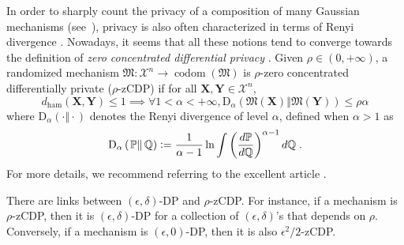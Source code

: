 \documentclass[10pt]{article} %
\newcommand{\eqdef}{\vcentcolon=}
\newcommand\mech[1]{\mathfrak{#1}}
\newcommand\set[1]{\mathcal{#1}}
\newcommand\vect[1]{\mathbf{#1}}
\newcommand\codom[1]{\operatorname{codom}\left({#1}\right)}
\newcommand\renyi[3]{\text{D}_{#1}\left( \left. {#2}\right\Vert {#3} \right)}
\newcommand\ham[2]{d_\mathrm{ham}\left( {#1}, {#2} \right)}
\newcommand\p[1]{\left( {#1}\right)}
\begin{document}
In order to sharply count the privacy of a composition of many Gaussian mechanisms (see~\citet{abadi2016deep}), privacy is also often characterized in terms of Renyi divergence \citep{mironov2017renyi}. Nowadays, it seems that all these notions tend to converge towards the definition of \emph{zero concentrated differential privacy} \citep{dwork2016concentrated,bun2016concentrated}. Given $\rho \in (0, +\infty)$, a randomized mechanism $\mech{M} : \set{X}^n \rightarrow \codom{\mech{M}}$ is $\rho$-zero concentrated differentially private ($\rho$-zCDP) if for all $\vect{X}, \vect{Y} \in \set{X}^n$, %
\begin{equation}
\label{eq:defcdp}
    \ham{\vect{X}}{\vect{Y}} \leq 1 \implies   \forall 1 < \alpha < +\infty, \renyi{\alpha}{\mech{M}(\vect{X})}{\mech{M}(\vect{Y})} \leq \rho \alpha 
\end{equation}
where $\renyi{\alpha}{\cdot}{\cdot}$ denotes the Renyi divergence of level $\alpha$, defined when $\alpha>1$ as 
\begin{equation*}
    \renyi{\alpha}{\mathbb{P}}{\mathbb{Q}} \eqdef \frac{1}{\alpha - 1} \ln \int  \p{\frac{d \mathbb{P}}{ d \mathbb{Q}}}^{\alpha - 1} d \mathbb{Q} \;.
\end{equation*}
For more details, we recommend referring to the excellent article \citet{van2014renyi}.

There are links between $(\epsilon, \delta)$-DP and $\rho$-zCDP. For instance, if a mechanism is $\rho$-zCDP, then  \citep[Proposition 3]{bun2016concentrated} it is $(\epsilon, \delta)$-DP for a collection of $(\epsilon, \delta)$'s that depends on $\rho$. Conversely,  if a mechanism is $(\epsilon, 0)$-DP, then \citep[Proposition 4]{bun2016concentrated} it is also $\epsilon^2/2$-zCDP.
\end{document}
